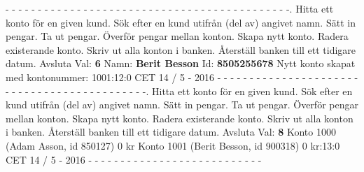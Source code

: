 - - - - - - - - - - - - - - - - - - - - - - - - - - - - - - - - - - - - - - - - - - - -.   Hitta ett konto för en given kund.   Sök efter en kund utifrån (del av) angivet namn.   Sätt in pengar.   Ta ut pengar.   Överför pengar mellan konton.   Skapa nytt konto.   Radera existerande konto.   Skriv ut alla konton i banken.   Återställ banken till ett tidigare datum. Avsluta\newline
Val: \textbf{6}\newline
Namn: \textbf{Berit Besson}\newline
Id: \textbf{8505255678}\newline
Nytt konto skapat med kontonummer: 1001:12:0 CET 14 / 5 - 2016\newline 
\newline
- - - - - - - - - - - - - - - - - - - - - - - - - - - - - - - - - - - - - - - - - - - -.   Hitta ett konto för en given kund.   Sök efter en kund utifrån (del av) angivet namn.   Sätt in pengar.   Ta ut pengar.   Överför pengar mellan konton.   Skapa nytt konto.   Radera existerande konto.   Skriv ut alla konton i banken.   Återställ banken till ett tidigare datum. Avsluta\newline
Val: \textbf{8}\newline
Konto 1000 (Adam Asson, id 850127) 0 kr\newline
Konto 1001 (Berit Besson, id 900318) 0 kr:13:0 CET 14 / 5 - 2016\newline
- - - - - - - - - - - - - - - - - - - - - - - - - - -\newline
